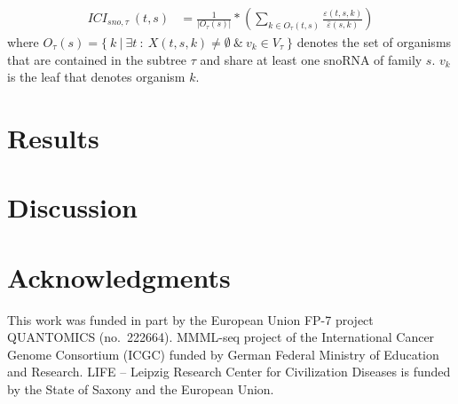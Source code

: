 \documentclass[preprint,3p,times,twocolumn]{elsarticle}
\begin{document}
\begin{equation}
  \begin{split}
    ICI_{sno,\tau}\:(t,s) & = \frac{1}{|O_\tau(s)|} * \left( \sum_{k\in O_\tau(t,s)} \frac{\varepsilon(t,s,k)}{\hat\varepsilon(s,k)} \right)
  \end{split}
\end{equation}
where $O_\tau(s) = \{\  k\  |\  \exists t\  :\  X(t,s,k) \ne \emptyset\ \&\ 
v_k \in V_\tau\ \}$ denotes the set of organisms that are contained in the
subtree $\tau$ and share at least one snoRNA of family $s$. $v_k$ is the leaf
that denotes organism $k$.

\section{Results}


\section{Discussion}



\section*{Acknowledgments}

This work was funded in part by the European Union FP-7 project QUANTOMICS
(no.\ 222664). MMML-seq project of the International Cancer Genome 
Consortium (ICGC) funded by German Federal Ministry of Education and Research. 
LIFE -- Leipzig Research Center for Civilization Diseases 
is funded by the State of Saxony and the European Union.






\end{document}
